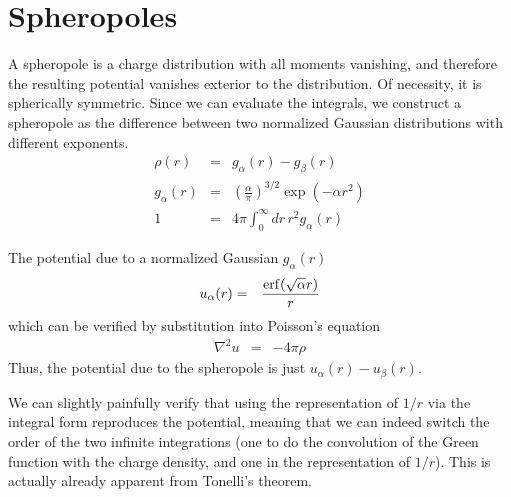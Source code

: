 \documentclass[12pt]{article}
\begin{document}
\section{Spheropoles}

A spheropole is a charge distribution with all moments vanishing, and therefore the resulting potential vanishes exterior to the distribution.  Of necessity, it is spherically symmetric.  Since we can evaluate the integrals, we construct a spheropole as the difference between two normalized Gaussian distributions with different exponents.
\begin{eqnarray}
  \rho(r) & = & g_\alpha(r) - g_\beta(r) \\
  g_\alpha(r) & = & \left( \frac{\alpha}{\pi} \right)^{3/2} \exp(-\alpha r^2) \\
  1 & = & 4 \pi \int_0^\infty \! dr \, r^2 g_\alpha(r)
\end{eqnarray}

The potential due to a normalized Gaussian $g_\alpha(r)$
\begin{eqnarray}
  u_\alpha(r) & = & \frac{\erf(\sqrt{\alpha} r)}{r}
\end{eqnarray}
which can be verified by substitution into Poisson's equation
\begin{eqnarray}
  \nabla^2 u & = & -4 \pi \rho
\end{eqnarray}
Thus, the potential due to the spheropole is just $u_\alpha(r) - u_\beta(r)$.

We can slightly painfully verify that using the representation of $1/r$ via the integral form reproduces the potential, meaning that we can indeed switch the order of the two infinite integrations (one to do the convolution of the Green function with the charge density, and one in the representation of $1/r$).  This is actually already apparent from Tonelli's theorem.
\end{document}
